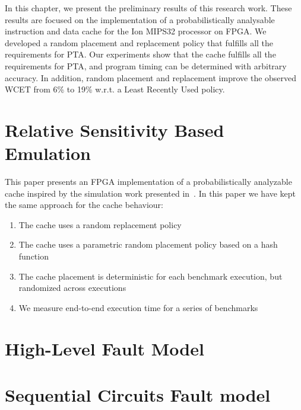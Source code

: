 

In this chapter, we present the preliminary results of this research work. These results are focused on the implementation of a probabilistically analysable instruction and data cache for the Ion MIPS32 processor on
FPGA. We developed a random placement and replacement policy that fulfills
all the requirements for PTA. Our experiments show that the cache fulfills all the requirements for PTA, and program timing can be determined with arbitrary accuracy. In addition, random placement and replacement improve the observed WCET from 6\% to 19\% w.r.t. a Least Recently Used policy.



\section{Relative Sensitivity Based Emulation}

This paper presents an FPGA implementation of a probabilistically analyzable
cache inspired by the simulation work presented
in~\cite{Kosmidis:2013:CDP:2485288.2485416}. In this paper we have
kept the same approach for the cache behaviour:
\begin{enumerate}
\item The cache uses a random replacement policy
\item The cache uses a parametric random placement policy based on
 a hash function
\item The cache placement is deterministic for each benchmark execution, but
  randomized across executions
\item We measure end-to-end execution time for a series of benchmarks
\end{enumerate}

\section{High-Level Fault Model}
\section{Sequential Circuits Fault model}
\label{Hardware Implementation}

\label{Cache Model}

